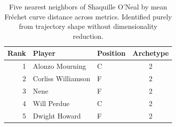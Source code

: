\begin{table}[htbp]
  \centering\small
  \begin{tabular}{rllc}
    \toprule
    Rank & Player & Position & Archetype \\
    \midrule
    1 & Alonzo Mourning & C & 2 \\
    2 & Corliss Williamson & F & 2 \\
    3 & Nene & F & 2 \\
    4 & Will Perdue & C & 2 \\
    5 & Dwight Howard & F & 2 \\
    \bottomrule
  \end{tabular}
  \caption{Five nearest neighbors of Shaquille O'Neal by mean Fr\'{e}chet curve distance across metrics. Identified purely from trajectory shape without dimensionality reduction.}
  \label{tab:Shaquille_O_Neal_frechet_curve_neighbors}
\end{table}

